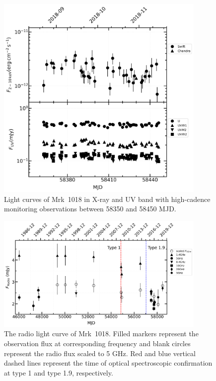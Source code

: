 \documentclass[twocolumn]{aastex63}
\begin{document}
\begin{figure}
\centering
	\includegraphics[width=0.9\textwidth]{./pic/subplots-xrt_uvot-radio-second-right-part.png}
    \caption{Light curves of Mrk~1018 in X-ray and UV band with high-cadence monitoring observations between 58350 and 58450 MJD.}
    \label{fig:x-ray-uv-lc-rp-secondaxis}
\end{figure}

\begin{figure}
\centering
	\includegraphics[width=0.9\textwidth]{./pic/subplots-radio-second_freq.png}
    \caption{The radio light curve of Mrk~1018. Filled markers represent the observation flux at corresponding frequency and blank circles represent the radio flux scaled to 5 GHz. Red and blue vertical dashed lines represent the time of optical spectroscopic confirmation at type 1 and type 1.9, respectively.}
    \label{fig:radio-lc}
\end{figure}
\end{document}

